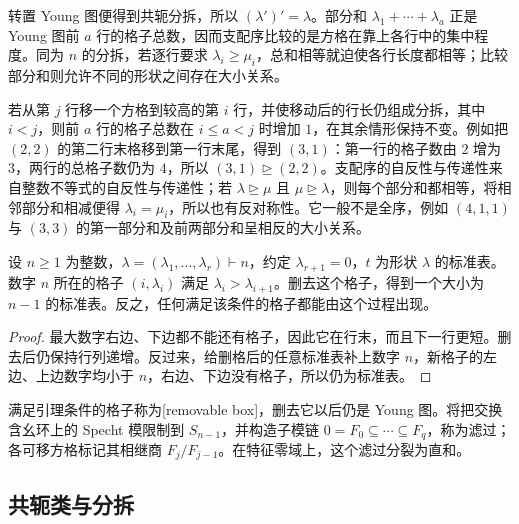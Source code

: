 转置 Young 图便得到共轭分拆，所以 \((\lambda')'=\lambda\)。部分和 \(\lambda_1+\cdots+\lambda_a\) 正是 Young 图前 \(a\) 行的格子总数，因而支配序比较的是方格在靠上各行中的集中程度。同为 \(n\) 的分拆，若逐行要求 \(\lambda_i\geq\mu_i\)，总和相等就迫使各行长度都相等；比较部分和则允许不同的形状之间存在大小关系。

\ProseParagraphBreak

若从第 \(j\) 行移一个方格到较高的第 \(i\) 行，并使移动后的行长仍组成分拆，其中 \(i<j\)，则前 \(a\) 行的格子总数在 \(i\leq a<j\) 时增加 \(1\)，在其余情形保持不变。例如把 \((2,2)\) 的第二行末格移到第一行末尾，得到 \((3,1)\)：第一行的格子数由 \(2\) 增为 \(3\)，两行的总格子数仍为 \(4\)，所以 \((3,1)\trianglerighteq(2,2)\)。支配序的自反性与传递性来自整数不等式的自反性与传递性；若 \(\lambda\trianglerighteq\mu\) 且 \(\mu\trianglerighteq\lambda\)，则每个部分和都相等，将相邻部分和相减便得 \(\lambda_i=\mu_i\)，所以也有反对称性。它一般不是全序，例如 \((4,1,1)\) 与 \((3,3)\) 的第一部分和及前两部分和呈相反的大小关系。

\begin{lemma}\label{b5:lem:standard-remove-largest}
	设 \(n\ge1\) 为整数，\(\lambda=(\lambda_1,\ldots,\lambda_r)\vdash n\)，约定 \(\lambda_{r+1}=0\)，\(t\) 为形状 \(\lambda\) 的标准表。数字 \(n\) 所在的格子 \((i,\lambda_i)\) 满足 \(\lambda_i>\lambda_{i+1}\)。删去这个格子，得到一个大小为 \(n-1\) 的标准表。反之，任何满足该条件的格子都能由这个过程出现。
\end{lemma}
\begin{proof}
	最大数字右边、下边都不能还有格子，因此它在行末，而且下一行更短。删去后仍保持行列递增。反过来，给删格后的任意标准表补上数字 \(n\)，新格子的左边、上边数字均小于 \(n\)，右边、下边没有格子，所以仍为标准表。
\end{proof}

满足引理条件的格子称为[removable box]，删去它以后仍是 Young 图。将把交换含幺环上的 Specht 模限制到 \(S_{n-1}\)，并构造子模链 \(0=F_0\subseteq\cdots\subseteq F_q\)，称为滤过；各可移方格标记其相继商 \(F_j/F_{j-1}\)。在特征零域上，这个滤过分裂为直和。

\subsection{共轭类与分拆}
\label{b5:subsec:0601:02}

